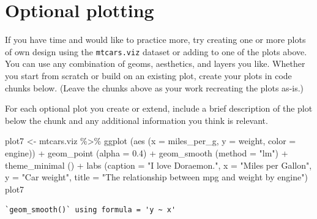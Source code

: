 \documentclass[
  man,
  floatsintext,
  longtable,
  nolmodern,
  notxfonts,
  notimes,
  colorlinks=true,linkcolor=blue,citecolor=blue,urlcolor=blue]{apa7}
\newenvironment{Shaded}{\begin{snugshade}}{\end{snugshade}}
\newcommand{\AttributeTok}[1]{\textcolor[rgb]{0.40,0.45,0.13}{#1}}
\newcommand{\FloatTok}[1]{\textcolor[rgb]{0.68,0.00,0.00}{#1}}
\newcommand{\FunctionTok}[1]{\textcolor[rgb]{0.28,0.35,0.67}{#1}}
\newcommand{\NormalTok}[1]{\textcolor[rgb]{0.00,0.23,0.31}{#1}}
\newcommand{\OtherTok}[1]{\textcolor[rgb]{0.00,0.23,0.31}{#1}}
\newcommand{\SpecialCharTok}[1]{\textcolor[rgb]{0.37,0.37,0.37}{#1}}
\newcommand{\StringTok}[1]{\textcolor[rgb]{0.13,0.47,0.30}{#1}}
\begin{document}
\section{Optional plotting}\label{optional-plotting}

If you have time and would like to practice more, try creating one or
more plots of own design using the \texttt{mtcars.viz} dataset or adding
to one of the plots above. You can use any combination of geoms,
aesthetics, and layers you like. Whether you start from scratch or build
on an existing plot, create your plots in code chunks below. (Leave the
chunks above as your work recreating the plots as-is.)

For each optional plot you create or extend, include a brief description
of the plot below the chunk and any additional information you think is
relevant.

\begin{Shaded}
\begin{Highlighting}[]
\NormalTok{plot7 }\OtherTok{\textless{}{-}}\NormalTok{ mtcars.viz }\SpecialCharTok{\%\textgreater{}\%} \FunctionTok{ggplot}\NormalTok{ (}\FunctionTok{aes}\NormalTok{ (}\AttributeTok{x =}\NormalTok{ miles\_per\_g, }\AttributeTok{y =}\NormalTok{ weight, }\AttributeTok{color =}\NormalTok{ engine)) }\SpecialCharTok{+}
  \FunctionTok{geom\_point}\NormalTok{ (}\AttributeTok{alpha =} \FloatTok{0.4}\NormalTok{) }\SpecialCharTok{+}
  \FunctionTok{geom\_smooth}\NormalTok{ (}\AttributeTok{method =} \StringTok{"lm"}\NormalTok{) }\SpecialCharTok{+}
  \FunctionTok{theme\_minimal}\NormalTok{ () }\SpecialCharTok{+}
  \FunctionTok{labs}\NormalTok{ (}\AttributeTok{caption =} \StringTok{"I love Doraemon."}\NormalTok{,}
        \AttributeTok{x =} \StringTok{"Miles per Gallon"}\NormalTok{,}
        \AttributeTok{y =} \StringTok{"Car weight"}\NormalTok{,}
        \AttributeTok{title =} \StringTok{"The relationship between mpg and weight by engine"}\NormalTok{)}
\NormalTok{plot7}
\end{Highlighting}
\end{Shaded}

\begin{verbatim}
`geom_smooth()` using formula = 'y ~ x'
\end{verbatim}
\end{document}
